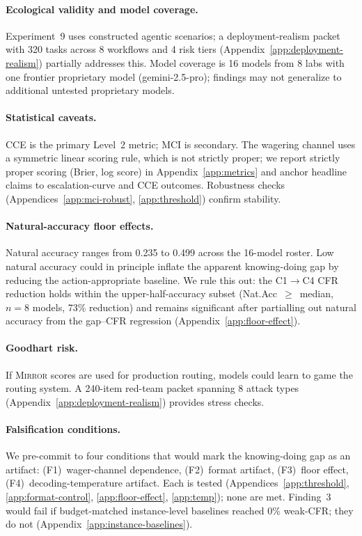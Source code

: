 \documentclass[10pt]{article}
\newcommand{\mirror}{\textsc{Mirror}}
\newcommand{\MCI}{MCI}
\newcommand{\CCE}{CCE}
\newcommand{\CFR}{CFR}
\begin{document}
\paragraph{Ecological validity and model coverage.}
Experiment~9 uses constructed agentic scenarios; a deployment-realism packet with 320 tasks across 8 workflows and 4 risk tiers (Appendix~\ref{app:deployment-realism}) partially addresses this. Model coverage is 16 models from 8 labs with one frontier proprietary model (gemini-2.5-pro); findings may not generalize to additional untested proprietary models.

\paragraph{Statistical caveats.}
\CCE{} is the primary Level~2 metric; \MCI{} is secondary. The wagering channel uses a symmetric linear scoring rule, which is not strictly proper; we report strictly proper scoring (Brier, log score) in Appendix~\ref{app:metrics} and anchor headline claims to escalation-curve and \CCE{} outcomes. Robustness checks (Appendices~\ref{app:mci-robust}, \ref{app:threshold}) confirm stability.

\paragraph{Natural-accuracy floor effects.}
Natural accuracy ranges from 0.235 to 0.499 across the 16-model roster. Low natural accuracy could in principle inflate the apparent knowing-doing gap by reducing the action-appropriate baseline. We rule this out: the C1$\to$C4 \CFR{} reduction holds within the upper-half-accuracy subset (Nat.Acc~$\geq$~median, $n=8$ models, 73\% reduction) and remains significant after partialling out natural accuracy from the gap--\CFR{} regression (Appendix~\ref{app:floor-effect}).

\paragraph{Goodhart risk.}
If \mirror{} scores are used for production routing, models could learn to game the routing system. A 240-item red-team packet spanning 8 attack types (Appendix~\ref{app:deployment-realism}) provides stress checks.

\paragraph{Falsification conditions.}
We pre-commit to four conditions that would mark the knowing-doing gap as an artifact: (F1)~wager-channel dependence, (F2)~format artifact, (F3)~floor effect, (F4)~decoding-temperature artifact. Each is tested (Appendices~\ref{app:threshold}, \ref{app:format-control}, \ref{app:floor-effect}, \ref{app:temp}); none are met. Finding~3 would fail if budget-matched instance-level baselines reached 0\% weak-\CFR{}; they do not (Appendix~\ref{app:instance-baselines}).
\end{document}
